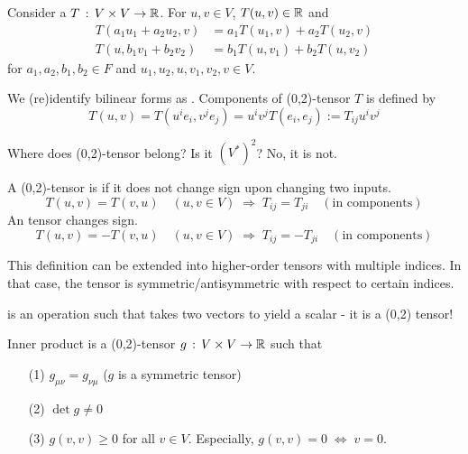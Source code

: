 \documentclass[a4paper, 10pt]{article}
\begin{document}
\begin{definition}
    Consider a  $T \,:\, V \times V \rightarrow \mathbb{R}$. For $u, v \in V$, $T(u,v) \in \mathbb{R}$ and
    \begin{align*}
        T(a_{1}u_{1} + a_{2}u_{2}, v) &= a_{1}T(u_{1},v) + a_{2}T(u_{2},v) \\
        T(u, b_{1}v_{1} + b_{2}v_{2}) &= b_{1}T(u,v_{1}) + b_{2}T(u,v_{2})
    \end{align*}
    for $a_{1},a_{2},b_{1},b_{2}\in F$ and $u_{1},u_{2},u,v_{1},v_{2},v\in V$.
\end{definition}
\begin{definition}[(0,2)-tensor]
    We (re)identify bilinear forms as . Components of (0,2)-tensor $T$ is defined by
    \[ T(u,v) = T(u^{i}e_{i},v^{j}e_{j}) = u^{i}v^{j}T(e_{i},e_{j}) := T_{ij}u^{i}v^{j} \]
\end{definition}
\begin{remark}
    Where does (0,2)-tensor belong? Is it $(V^{\ast})^{2}$? No, it is not.
\end{remark}
\begin{definition}
    A (0,2)-tensor is  if it does not change sign upon changing two inputs.
    \[ T(u,v) = T(v,u) \quad (u,v \in V) \;\Longrightarrow\; T_{ij} = T_{ji} \quad (\text{in components}) \]
    An  tensor changes sign.
    \[ T(u,v) = -T(v,u) \quad (u,v \in V) \;\Longrightarrow\; T_{ij} = -T_{ji} \quad (\text{in components}) \]
\end{definition}
\begin{remark}
    This definition can be extended into higher-order tensors with multiple indices. In that case, the tensor is symmetric/antisymmetric with respect to certain indices.
\end{remark}
\newpage


 is an operation such that takes two vectors to yield a scalar - it is a (0,2) tensor!

\begin{definition}
    Inner product is a (0,2)-tensor $g \,:\, V \times V \rightarrow \mathbb{R}$ such that
    \begin{itemize}
        \item[(1)] $g_{\mu\nu} = g_{\nu\mu}$ ($g$ is a symmetric tensor)
        \item[(2)] $\det g \neq 0$
        \item[(3)] $g(v,v) \geq 0$ for all $v \in V$. Especially, $g(v,v) = 0 \;\Longleftrightarrow\; v = 0$.
    \end{itemize}
\end{definition}
\end{document}
